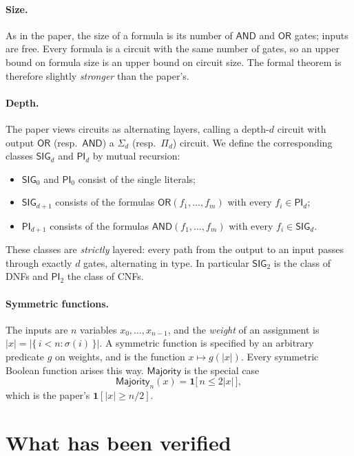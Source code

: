 \documentclass[11pt]{article}
\newcommand{\sig}{\mathsf{SIG}}
\newcommand{\piC}{\mathsf{PI}}
\newcommand{\AND}{\mathsf{AND}}
\newcommand{\OR}{\mathsf{OR}}
\newcommand{\Majority}{\mathsf{Majority}}
\begin{document}
\paragraph{Size.} As in the paper, the size of a formula is its number of $\AND$ and $\OR$ gates; inputs are free. Every formula is a circuit with the same number of gates, so an upper bound on formula size is an upper bound on circuit size. The formal theorem is therefore slightly \emph{stronger} than the paper's.

\paragraph{Depth.} The paper views circuits as alternating layers, calling a depth-$d$ circuit with output $\OR$ (resp.\ $\AND$) a $\Sigma_d$ (resp.\ $\Pi_d$) circuit. We define the corresponding classes $\sig_d$ and $\piC_d$ by mutual recursion:
\begin{itemize}
  \item $\sig_0$ and $\piC_0$ consist of the single literals;
  \item $\sig_{d+1}$ consists of the formulas $\OR(f_1, \dots, f_m)$ with every $f_i \in \piC_d$;
  \item $\piC_{d+1}$ consists of the formulas $\AND(f_1, \dots, f_m)$ with every $f_i \in \sig_d$.
\end{itemize}
These classes are \emph{strictly} layered: every path from the output to an input passes through exactly $d$ gates, alternating in type. In particular $\sig_2$ is the class of DNFs and $\piC_2$ the class of CNFs.

\paragraph{Symmetric functions.} The inputs are $n$ variables $x_0, \dots, x_{n-1}$, and the \emph{weight} of an assignment is $|x| = |\{\, i < n : \sigma(i) \,\}|$. A symmetric function is specified by an arbitrary predicate $g$ on weights, and is the function $x \mapsto g(|x|)$. Every symmetric Boolean function arises this way. $\Majority$ is the special case
\[ \Majority_n(x) = \mathbf{1}\bigl[\, n \le 2|x| \,\bigr], \]
which is the paper's $\mathbf{1}[|x| \ge n/2]$.

\section{What has been verified}
\label{sec:statements}
\end{document}
